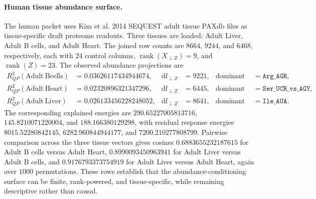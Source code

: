 \paragraph{Human tissue abundance surface.}
The human packet uses Kim et al. 2014 SEQUEST adult tissue PAXdb files as tissue-specific draft proteome readouts. Three tissues are loaded: Adult Liver, Adult B cells, and Adult Heart. The joined row counts are $8664$, $9244$, and $6468$, respectively, each with $24$ control columns, $\operatorname{rank}(X_{\perp Z})=9$, and $\operatorname{rank}(Z)=23$. The observed abundance projections are
$$
\begin{aligned}
R^2_{QP}(\mathrm{Adult\ Bcells})&=0.03626117434944674, & \operatorname{df}_{\perp Z}&=9221, & \text{dominant coordinate}&=\texttt{Arg\_AGR},\\
R^2_{QP}(\mathrm{Adult\ Heart})&=0.02320896321347296, & \operatorname{df}_{\perp Z}&=6445, & \text{dominant coordinate}&=\texttt{Ser\_UCR\_vs\_AGY},\\
R^2_{QP}(\mathrm{Adult\ Liver})&=0.026133456228248052, & \operatorname{df}_{\perp Z}&=8641, & \text{dominant coordinate}&=\texttt{Ile\_AUA}.
\end{aligned}
$$
The corresponding explained energies are $290.65227005813716$, $145.8210071220004$, and $188.166380129298$, with residual response energies $8015.52280842145$, $6282.960844944177$, and $7200.210277808799$. Pairwise comparison across the three tissue vectors gives cosines $0.6883655232187615$ for Adult B cells versus Adult Heart, $0.8990093450963941$ for Adult Liver versus Adult B cells, and $0.9176793373754919$ for Adult Liver versus Adult Heart, again over $1000$ permutations. These rows establish that the abundance-conditioning surface can be finite, rank-powered, and tissue-specific, while remaining descriptive rather than causal.

